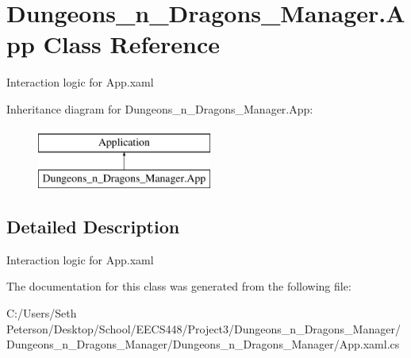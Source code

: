\hypertarget{class_dungeons__n___dragons___manager_1_1_app}{}\section{Dungeons\+\_\+n\+\_\+\+Dragons\+\_\+\+Manager.\+App Class Reference}
\label{class_dungeons__n___dragons___manager_1_1_app}


Interaction logic for App.\+xaml  


Inheritance diagram for Dungeons\+\_\+n\+\_\+\+Dragons\+\_\+\+Manager.\+App\+:\begin{figure}[H]
\begin{center}
\leavevmode
\includegraphics[height=2.000000cm]{class_dungeons__n___dragons___manager_1_1_app}
\end{center}
\end{figure}


\subsection{Detailed Description}
Interaction logic for App.\+xaml 



The documentation for this class was generated from the following file\+:\begin{DoxyCompactItemize}
\item 
C\+:/\+Users/\+Seth Peterson/\+Desktop/\+School/\+E\+E\+C\+S448/\+Project3/\+Dungeons\+\_\+n\+\_\+\+Dragons\+\_\+\+Manager/\+Dungeons\+\_\+n\+\_\+\+Dragons\+\_\+\+Manager/\+Dungeons\+\_\+n\+\_\+\+Dragons\+\_\+\+Manager/App.\+xaml.\+cs\end{DoxyCompactItemize}
